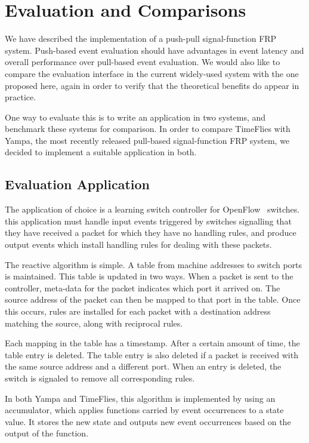 \chapter{Evaluation and Comparisons}
\label{chapter:Evaluation_and_Comparisons}

We have described the implementation of a push-pull signal-function FRP system.
Push-based event evaluation should have advantages in event latency and overall
performance over pull-based event evaluation. We would also like to compare
the evaluation interface in the current widely-used system with the one proposed
here, again in order to verify that the theoretical benefits do appear in
practice.

One way to evaluate this is to write an application in two systems, and benchmark
these systems for comparison. In order to compare TimeFlies with Yampa, the most
recently released pull-based signal-function FRP system, we decided to implement
a suitable application in both.

\section{Evaluation Application}
\label{section:Evaluation_and_Comparisons-Evaluation_Application}

The application of choice is a learning switch controller for OpenFlow~\cite{OpenflowSpec}
switches. this application must handle input events triggered by switches
signalling that they have received a packet for which they have no handling
rules, and produce output events which install handling rules for dealing with
these packets.

The reactive algorithm is simple. A table from machine addresses to switch ports
is maintained. This table is updated in two ways. When a packet is sent to the
controller, meta-data for the packet indicates which port it arrived on. The
source address of the packet can then be mapped to that port in the table.
Once this occurs, rules are installed for each packet with a destination address
matching the source, along with reciprocal rules.

Each mapping in the table has a timestamp. After a certain amount of time, the
table entry is deleted. The table entry is also deleted if a packet is received
with the same source address and a different port. When an entry is deleted,
the switch is signaled to remove all corresponding rules.

In both Yampa and TimeFlies, this algorithm is implemented by using an accumulator,
which applies functions carried by event occurrences to a state value. It stores
the new state and outputs new event occurrences based on the output of the function.

